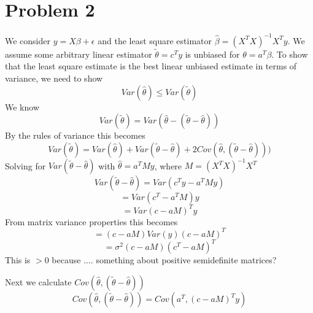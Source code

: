 	\section*{Problem 2}
	We consider $y=X\beta + \epsilon$ and the least square estimator $\hat{\beta} = (X^TX)^{-1}X^Ty$. We assume some arbitrary linear estimator $\tilde{\theta} = c^Ty$ is unbiased for $\theta = a^T\beta$. To show that the least square estimate is the best linear unbiased estimate in terms of variance, we need to show
\[ Var(\hat{\theta}) \leq  Var(\tilde{\theta}) \]
We know 
\[ Var(\tilde{\theta}) = Var(\hat{\theta} - (\tilde{\theta} - \hat{\theta})) \]
By the rules of variance this becomes
\[ Var(\tilde{\theta}) = Var(\hat{\theta}) + Var(\tilde{\theta} - \hat{\theta}) + 2Cov(\hat{\theta},(\tilde{\theta} - \hat{\theta}))) \]
Solving for $Var(\tilde{\theta} - \hat{\theta})$ with $\hat{\theta} = a^TMy$, where $M = (X^TX)^{-1}X^T$ 
\[ Var(\tilde{\theta} - \hat{\theta}) = Var(c^Ty - a^TMy) \]
\[  = Var(c^T - a^TM)y \]
\[  = Var(c - aM)^Ty \]
From matrix variance properties this becomes
\[  = (c - aM)Var(y)(c - aM)^T \]
\[  = \sigma^2(c - aM)(c^T - aM)^T \]
This is $> 0$ because .... something about positive semidefinite matrices?\newline

\noindent Next we calculate $Cov(\hat{\theta},(\tilde{\theta} - \hat{\theta}))$
\[ Cov(\hat{\theta},(\tilde{\theta} - \hat{\theta})) = Cov(a^T,(c-aM)^Ty)  \]

